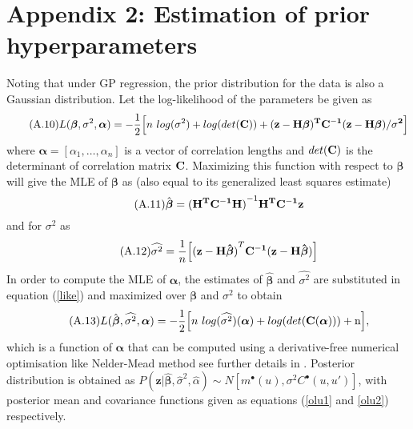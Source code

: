 \section*{Appendix 2: Estimation of prior hyperparameters}\label{hyper}
Noting that under GP regression, the prior distribution for the data is also a Gaussian distribution.
Let the log-likelihood of the parameters be given as
\begin{equation}\tag{A.10}\label{like}
L(\boldsymbol \beta, \sigma^2, \boldsymbol{\alpha})=-\frac{1}{2}\Big[n~log(\sigma^2)+log(det(\bf C))+(z-H\boldsymbol \beta)^T \bf C^{-1}(z-H\boldsymbol \beta)/\sigma^2\Big]
\end{equation}
where $\boldsymbol{\alpha}=[\alpha_1, \ldots, \alpha_n]$ is a vector of correlation lengths and $det(\bf C)$ is the determinant of correlation matrix $\bf C$. Maximizing this function with respect to $\boldsymbol \beta$ will give the MLE of $\boldsymbol \beta$ as (also equal to its generalized least squares estimate)
\begin{equation}\tag{A.11}
\hat{\boldsymbol \beta}=(\mathbf{H^TC^{-1}H)}^{-1}\bf H^TC^{-1}z
\end{equation}
and for $\sigma^2$ as 
\begin{equation}\tag{A.12}
\widehat{\sigma^2}=\frac{1}{n}\Big[\mathbf{(z-H\hat{\boldsymbol \beta})}^T\bf C^{-1}(\bf z-H\hat{\boldsymbol \beta})\Big]
\end{equation}
In order to compute the MLE of $\boldsymbol{\alpha}$, the estimates of $\hat{\boldsymbol \beta}$ and $\widehat{\sigma^2}$ are substituted in equation (\ref{like}) and maximized over $\boldsymbol \beta$ and $\sigma^2$ to obtain
\begin{equation}\tag{A.13}
L(\hat{\boldsymbol \beta},\widehat{\sigma^2},\boldsymbol{\alpha})=-\frac{1}{2}\Big[n~log(\widehat{\sigma^2})(\boldsymbol{\alpha})+log(det(\bf C(\boldsymbol{\alpha})))+\textnormal n\Big],
\end{equation}
which is a function of $\boldsymbol{\alpha}$ that can be computed using a derivative-free numerical optimisation like Nelder-Mead method see further details in \citep{70,q10}.
Posterior distribution is obtained as $P(\mathbf{z}|\widehat{\boldsymbol\beta},\hat\sigma^2,\hat\alpha)\sim N[m^{\bullet}(u),\sigma^2C^{\bullet}(u,u')]$, with posterior mean and covariance functions given as equations (\ref{olu1} and \ref{olu2}) respectively.


